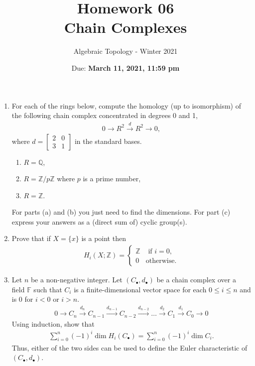 \documentclass{article}
\title{Homework 06 \\ Chain Complexes}
\author{Algebraic Topology - Winter 2021}
\date{Due: \textbf{March 11, 2021, 11:59 pm}}
\begin{document}
\maketitle

\begin{enumerate}
    \item For each of the rings below, compute the homology (up to isomorphism) of the following chain complex concentrated in degrees 0 and 1,
    \begin{align*}
        0 \to R^2 \overset{d}{\longrightarrow} R^2 \to 0,
    \end{align*}
    where $d = \begin{bmatrix} 2 & 0 \\ 3 & 1\end{bmatrix}$ in the standard bases.
    \begin{enumerate}
        \item $ R = \mathbb{Q}$,
        \item $ R = \mathbb{Z}/p \mathbb{Z}$ where $p$ is a prime number,
        \item $ R = \mathbb{Z}$.
    \end{enumerate}
    For parts (a) and (b) you just need to find the dimensions. For part (c) express your answers as a (direct sum of) cyclic group(s).
    \item Prove that if $X = \{x\}$ is a point then 
    \begin{align*}
        H_i(X; \mathbb{Z}) = 
        \begin{cases}
        \mathbb{Z} & \mbox{ if } i = 0, \\
        0 & \mbox{otherwise.}
        \end{cases}
    \end{align*}
    
        \item Let $n$ be a non-negative integer. Let $(C_\bullet, d_\bullet)$ be a chain complex over a field $\mathbb{F}$ such that $C_i$ is a finite-dimensional vector space for each $ 0 \le i \le n$ and is 0 for $ i < 0$ or $i > n$. 
    \begin{align*}
        0 \to C_n \overset{d_n}{\longrightarrow} C_{n-1}
        \overset{d_{n-1}}{\longrightarrow} C_{n-2}
        \overset{d_{n-2}}{\longrightarrow} 
        \dots
        \overset{d_{2}}{\longrightarrow} C_1
        \overset{d_{1}}{\longrightarrow} C_0
        \to 0
    \end{align*}
    Using induction, show that 
    \begin{align*}
        \sum \limits_{i=0}^n (-1)^i\dim H_i (C_\bullet) =        
        \sum \limits_{i=0}^n (-1)^i\dim C_i.
    \end{align*}
    Thus, either of the two sides can be used to define the Euler characteristic of $(C_\bullet, d_\bullet)$.
    
\end{enumerate}
\end{document}
